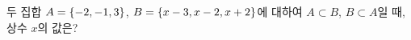 두 집합 $A=\{-2{,}\mkern3mu\mathopen{}-1{,}\mkern3mu\mathopen{}3\}$, $B=\{x-3{,}\mkern3mu\mathopen{}x-2{,}\mkern3mu\mathopen{}x+2\}$에 대하여 $A\subset B$, $B\subset A$일 때, 상수 $x$의 값은?
